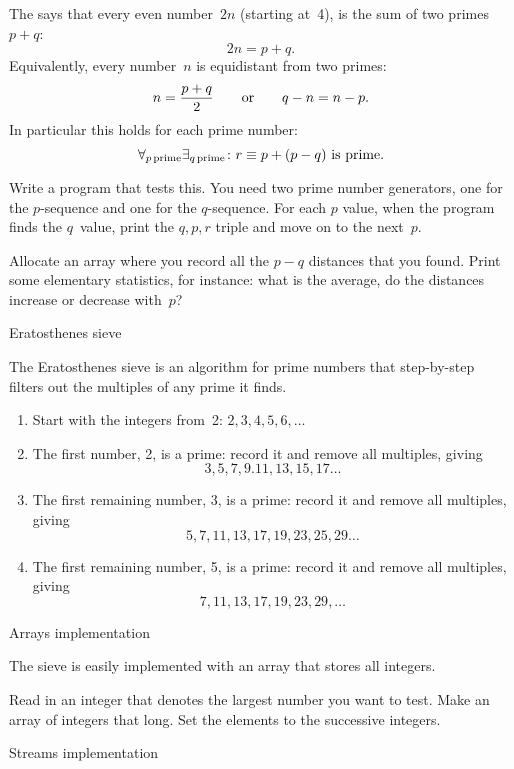\begin{exercise}
  \label{ex:prime:goldbach-pqr}
  The  says that every even number~$2n$
  (starting at~4), is the sum of two primes $p+q$: \[ 2n=p+q.\]
  Equivalently, every number~$n$ is equidistant from two primes:
  \[ n=\frac{p+q}2\qquad\hbox{or}\qquad q-n = n-p.\]
  In particular this holds for each prime number:
  \[ \forall_{p\,\mathrm{prime}}\exists_{q\,\mathrm{prime}}\colon
  \hbox{$r\equiv p+(p-q)$ is prime}. \]

  Write a program that tests this. You need two prime number
  generators, one for the $p$-sequence and one for the $q$-sequence.
  For each $p$ value, 
  when the program finds the $q$~value, print the $q,p,r$ triple and
  move on to the next~$p$.

  Allocate an array where you record all the $p-q$ distances that you
  found. Print some elementary statistics, for instance: what is the average, do the
  distances increase or decrease with~$p$?
\end{exercise}

 {Eratosthenes sieve}

The Eratosthenes sieve is an algorithm for prime numbers that
step-by-step filters out the multiples of any prime it finds.
\begin{enumerate}
\item Start with the integers from~2: $2,3,4,5,6,\ldots$
\item The first number, 2, is a prime: record it and remove all
  multiples, giving
  \[ 3,5,7,9.11,13,15,17\dots \]
\item The first remaining number, 3, is a prime: record it and remove
  all multiples, giving
  \[ 5,7,11,13,17,19,23,25,29\ldots \]
\item The first remaining number, 5, is a prime: record it and remove
  all multiples, giving
  \[ 7,11,13,17,19,23,29,\ldots \]
\end{enumerate}

 {Arrays implementation}
\label{sec:arraysieve}

The sieve is easily implemented with an array that stores all integers.

\begin{exercise}
  Read in an integer that denotes the largest number you want to test.
  Make an array of integers that long. Set the elements to the
  successive integers.
\end{exercise}

 {Streams implementation}
\label{sec:streamsieve}


